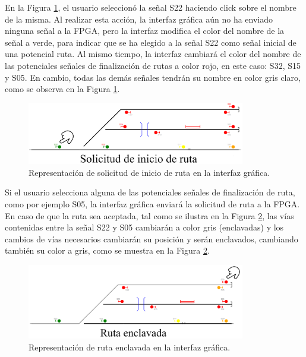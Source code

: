	En la Figura \ref{fig:AGG_routes_2}, el usuario seleccionó la señal S22 haciendo click sobre el nombre de la misma. Al realizar esta acción, la interfaz gráfica aún no ha enviado ninguna señal a la FPGA, pero la interfaz modifica el color del nombre de la señal a verde, para indicar que se ha elegido a la señal S22 como señal inicial de una potencial ruta. Al mismo tiempo, la interfaz cambiará el color del nombre de las potenciales señales de finalización de rutas a color rojo, en este caso: S32, S15 y S05. En cambio, todas las demás señales tendrán su nombre en color gris claro, como se observa en la Figura \ref{fig:AGG_routes_2}. 
	
	\begin{figure}[H]
		\centering
		\includegraphics[width=0.85\textwidth]{AGG/images/AGG_routes_2}
		\centering\caption{Representación de solicitud de inicio de ruta en la interfaz gráfica.}
		\label{fig:AGG_routes_2}
	\end{figure}
	
	Si el usuario selecciona alguna de las potenciales señales de finalización de ruta, como por ejemplo S05, la interfaz gráfica enviará la solicitud de ruta a la FPGA. En caso de que la ruta sea aceptada, tal como se ilustra en la Figura \ref{fig:AGG_routes_3}, las vías contenidas entre la señal S22 y S05 cambiarán a color gris (enclavadas) y los cambios de vías necesarios cambiarán su posición y serán enclavados, cambiando también su color a gris, como se muestra en la Figura \ref{fig:AGG_routes_3}.
	
	\begin{figure}[H]
		\centering
		\includegraphics[width=0.85\textwidth]{AGG/images/AGG_routes_3}
		\centering\caption{Representación de ruta enclavada en la interfaz gráfica.}
		\label{fig:AGG_routes_3}
	\end{figure}
	
